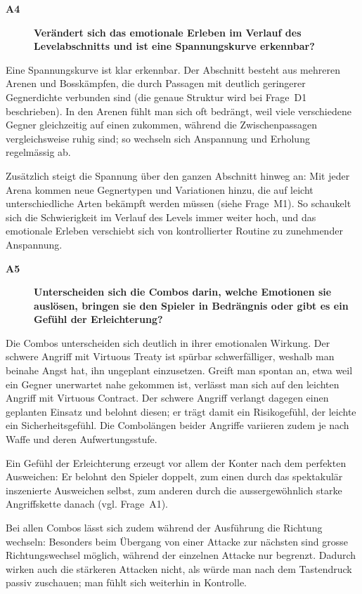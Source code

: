 \documentclass[../Main.tex]{subfiles}
\begin{document}
\begin{description}
    \item[\textbf{A4}] \textbf{Verändert sich das emotionale Erleben im Verlauf des Levelabschnitts und ist eine Spannungskurve erkennbar?}
\end{description}

Eine Spannungskurve ist klar erkennbar. Der Abschnitt besteht aus mehreren Arenen und Bosskämpfen, die durch Passagen mit deutlich geringerer Gegnerdichte verbunden sind (die genaue Struktur wird bei Frage~D1 beschrieben). In den Arenen fühlt man sich oft bedrängt, weil viele verschiedene Gegner gleichzeitig auf einen zukommen, während die Zwischenpassagen vergleichsweise ruhig sind; so wechseln sich Anspannung und Erholung regelmässig ab.

Zusätzlich steigt die Spannung über den ganzen Abschnitt hinweg an: Mit jeder Arena kommen neue Gegnertypen und Variationen hinzu, die auf leicht unterschiedliche Arten bekämpft werden müssen (siehe Frage~M1). So schaukelt sich die Schwierigkeit im Verlauf des Levels immer weiter hoch, und das emotionale Erleben verschiebt sich von kontrollierter Routine zu zunehmender Anspannung.

\begin{description}
    \item[\textbf{A5}] \textbf{Unterscheiden sich die Combos darin, welche Emotionen sie auslösen, bringen sie den Spieler in Bedrängnis oder gibt es ein Gefühl der Erleichterung?}
\end{description}

Die Combos unterscheiden sich deutlich in ihrer emotionalen Wirkung. Der schwere Angriff mit Virtuous Treaty ist spürbar schwerfälliger, weshalb man beinahe Angst hat, ihn ungeplant einzusetzen. Greift man spontan an, etwa weil ein Gegner unerwartet nahe gekommen ist, verlässt man sich auf den leichten Angriff mit Virtuous Contract. Der schwere Angriff verlangt dagegen einen geplanten Einsatz und belohnt diesen; er trägt damit ein Risikogefühl, der leichte ein Sicherheitsgefühl. Die Combolängen beider Angriffe variieren zudem je nach Waffe und deren Aufwertungsstufe.

Ein Gefühl der Erleichterung erzeugt vor allem der Konter nach dem perfekten Ausweichen: Er belohnt den Spieler doppelt, zum einen durch das spektakulär inszenierte Ausweichen selbst, zum anderen durch die aussergewöhnlich starke Angriffskette danach (vgl. Frage~A1).

Bei allen Combos lässt sich zudem während der Ausführung die Richtung wechseln: Besonders beim Übergang von einer Attacke zur nächsten sind grosse Richtungswechsel möglich, während der einzelnen Attacke nur begrenzt. Dadurch wirken auch die stärkeren Attacken nicht, als würde man nach dem Tastendruck passiv zuschauen; man fühlt sich weiterhin in Kontrolle.
\end{document}
